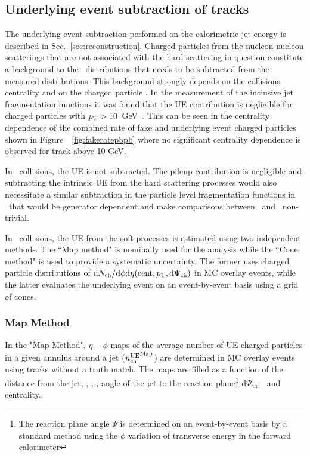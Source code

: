 \subsection{Underlying event subtraction of tracks}
\label{sec:cuts_UE}
The underlying event subtraction performed on the calorimetric jet energy is described in Sec.~\ref{sec:reconstruction}.
Charged particles from the nucleon-nucleon scatterings that are not associated with the hard scattering in question constitute a background to the \Dptr\ distributions that needs to be subtracted from the measured distributions.
This background strongly depends on the collisions centrality and on the charged particle \pt.
In the measurement of the inclusive jet fragmentation functions it was found that the UE contribution is negligible for charged particles with $\mbox{$p_{\mathrm{T}}$}>10$~GeV~\cite{PhysRevC.98.024908}.
This can be seen in the centrality dependence of the combined rate of fake and underlying event charged particles shown in Figure~~\ref{fig:fakeratepbpb} where no significant centrality dependence is observed for track above 10 GeV.

In \pp\ collisions, the UE is not subtracted.
The pileup contribution is negligible and subtracting the intrinsic UE from the hard scattering processes would also necessitate a similar subtraction in the particle level fragmentation functions in \pbpb\ that would be generator dependent and make comparisons between \pp\ and \pbpb\ non-trivial.

In \pbpb\ collisions, the UE from the soft processes is estimated using two independent methods.
The ``Map method" is nominally used for the analysis while the ``Cone method" is used to provide a systematic uncertainty.
The former uses charged particle distributions of $\mathrm{d}N_{\mathrm{ch}}/\mathrm{d}\phi\mathrm{d}\eta(\mathrm{cent},\mbox{$p_{\mathrm{T}}$}, \mathrm{d}\Psi_{\mathrm{ch}})$ in MC overlay events, while the latter evaluates the underlying event on an event-by-event basis using a grid of cones.

\subsubsection{Map Method}
\label{sec:map_method}
In the "Map Method", $\eta-\phi$ maps of the average number of UE charged particles in a given annulus around a jet ($\mbox{$n_{\mathrm{ch}}^{\mathrm{UE}}$}^{\mathrm{Map}}$) are determined in MC overlay events using tracks without a truth match.
The maps are filled as a function of the distance from the jet, \ptjet, \etajet, \phijet, angle of the jet to the reaction plane\footnote{The reaction plane angle $\Psi$ is determined on an event-by-event basis by a standard method using the $\phi$ variation of transverse energy in the forward calorimeter} $ \mathrm{d}\Psi_{\mathrm{ch}}$, \pt\ and centrality.

